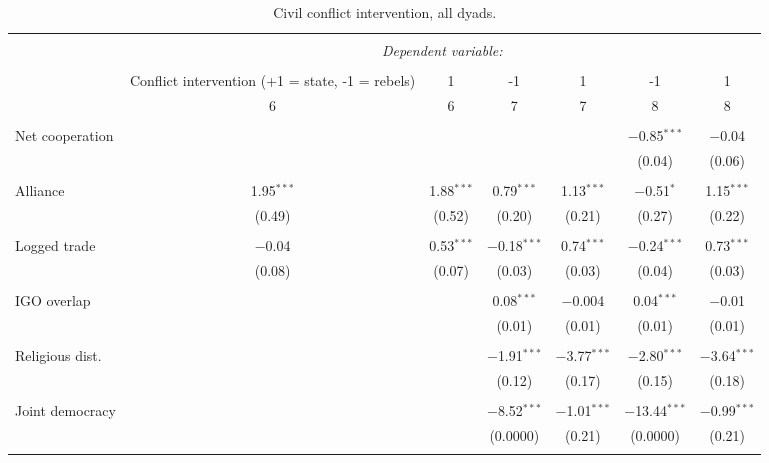 \documentclass[10pt,]{article}
\begin{document}
\newpage

\begin{landscape}

\begin{table}[!htbp] \centering 
  \caption{\label{tab:InterTableAllDyads}Civil conflict intervention, all dyads.} 
  \label{} 
\begin{tabular}{@{\extracolsep{5pt}}lcccccc} 
\\[-1.8ex]\hline 
\hline \\[-1.8ex] 
 & \multicolumn{6}{c}{\textit{Dependent variable:}} \\ 
\cline{2-7} 
\\[-1.8ex] & Conflict intervention (+1 = state, -1 = rebels) & 1 & -1 & 1 & -1 & 1 \\ 
 & 6 & 6 & 7 & 7 & 8 & 8 \\ 
\hline \\[-1.8ex] 
 Net cooperation &  &  &  &  & $-$0.85$^{***}$ & $-$0.04 \\ 
  &  &  &  &  & (0.04) & (0.06) \\ 
  & & & & & & \\ 
 Alliance & 1.95$^{***}$ & 1.88$^{***}$ & 0.79$^{***}$ & 1.13$^{***}$ & $-$0.51$^{*}$ & 1.15$^{***}$ \\ 
  & (0.49) & (0.52) & (0.20) & (0.21) & (0.27) & (0.22) \\ 
  & & & & & & \\ 
 Logged trade & $-$0.04 & 0.53$^{***}$ & $-$0.18$^{***}$ & 0.74$^{***}$ & $-$0.24$^{***}$ & 0.73$^{***}$ \\ 
  & (0.08) & (0.07) & (0.03) & (0.03) & (0.04) & (0.03) \\ 
  & & & & & & \\ 
 IGO overlap &  &  & 0.08$^{***}$ & $-$0.004 & 0.04$^{***}$ & $-$0.01 \\ 
  &  &  & (0.01) & (0.01) & (0.01) & (0.01) \\ 
  & & & & & & \\ 
 Religious dist. &  &  & $-$1.91$^{***}$ & $-$3.77$^{***}$ & $-$2.80$^{***}$ & $-$3.64$^{***}$ \\ 
  &  &  & (0.12) & (0.17) & (0.15) & (0.18) \\ 
  & & & & & & \\ 
 Joint democracy &  &  & $-$8.52$^{***}$ & $-$1.01$^{***}$ & $-$13.44$^{***}$ & $-$0.99$^{***}$ \\ 
  &  &  & (0.0000) & (0.21) & (0.0000) & (0.21) \\ 
  & & & & & & \\ 

\end{tabular}
\end{table}
\end{landscape}
\end{document}
